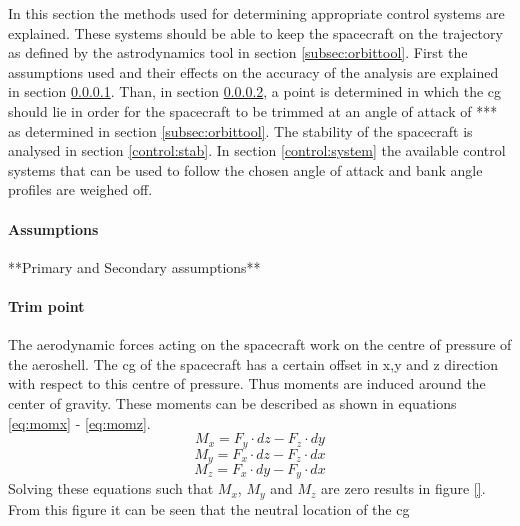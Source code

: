 In this section the methods used for determining appropriate control systems are explained. These systems should be able to keep the spacecraft on the trajectory as defined by the astrodynamics tool in section \ref{subsec:orbittool}. First the assumptions used and their effects on the accuracy of the analysis are explained in section \ref{control:assumptions}. Than, in section \ref{control:trim}, a point is determined in which the \gls{cg} should lie in order for the spacecraft to be trimmed at an angle of attack of *** as determined in section  \ref{subsec:orbittool}. The stability of the spacecraft is analysed in section \ref{control:stab}. In section \ref{control:system} the available control systems that can be used to follow the chosen angle of attack and bank angle profiles are weighed off.

\paragraph{Assumptions}
\label{control:assumptions}
**Primary and Secondary assumptions**

\paragraph{Trim point}
\label{control:trim}
The aerodynamic forces acting on the spacecraft work on the centre of pressure of the aeroshell. The \gls{cg} of the spacecraft has a certain offset in x,y and z direction with respect to this centre of pressure. Thus moments are induced around the center of gravity. These moments can be described as shown in equations \ref{eq:momx} - \ref{eq:momz}.
\begin{equation}
\label{eq:momx}
M_x = F_y \cdot dz - F_z \cdot dy
\end{equation}
\begin{equation}
\label{eq:momy}
M_y = F_x \cdot dz - F_z \cdot dx
\end{equation}
\begin{equation}
\label{eq:momz}
M_z = F_x \cdot dy - F_y \cdot dx
\end{equation}
Solving these equations such that $M_{x}$, $M_{y}$ and $M_{z}$ are zero results in figure \ref{}. From this figure it can be seen that the neutral location of the \gls{cg} 

